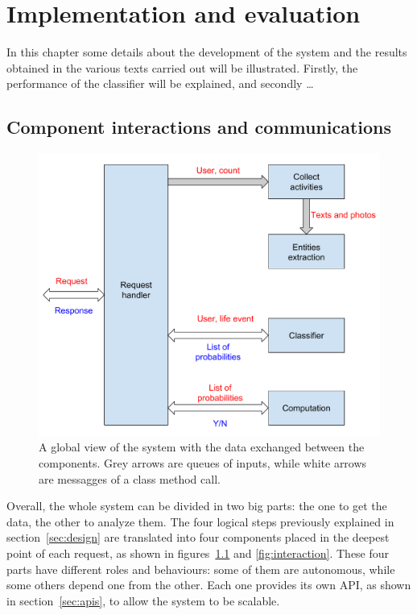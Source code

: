 \chapter{Implementation and evaluation}
\label{cha:results}
In this chapter some details about the development of the system and the results obtained in the various texts carried out will be illustrated. Firstly, the performance of the classifier will be explained, and secondly \dots

\section{Component interactions and communications}
\label{sec:view}
\begin{figure}
\centering
\includegraphics[width=%
1.0\textwidth]{img/Globalview}
\caption{A global view of the system with the data exchanged between the components. Grey arrows are queues of inputs, while white arrows are messagges of a class method call.}
\label{fig:globalview}
\end{figure}

Overall, the whole system can be divided in two big parts: the one to get the data, the other to analyze them. The four logical steps previously explained in section~\ref{sec:design} are translated into four components placed in the deepest point of each request, as shown in figures~\ref{fig:globalview} and \ref{fig:interaction}. These four parts have different roles and behaviours: some of them are autonomous, while some others depend one from the other. Each one provides its own API, as shown in section~\ref{sec:apis}, to allow the system to be scalable.

